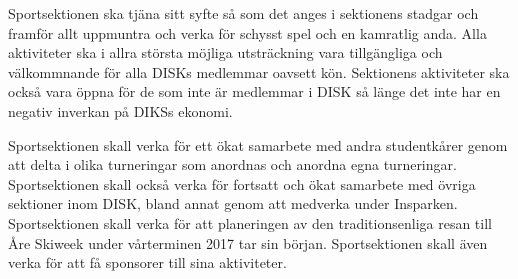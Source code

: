 \documentclass[12pt,a4paper]{article}
\begin{document}
	Sportsektionen ska tjäna sitt syfte så som det anges i sektionens stadgar och framför allt uppmuntra och verka för schysst spel och en kamratlig anda. Alla aktiviteter ska i allra största möjliga utsträckning vara tillgängliga och välkommnande för alla DISKs medlemmar oavsett kön. Sektionens aktiviteter ska också vara öppna för de som inte är medlemmar i DISK så länge det inte har en negativ inverkan på DIKSs ekonomi.

	Sportsektionen skall verka för ett ökat samarbete med andra studentkårer genom att delta i olika turneringar som anordnas och anordna egna turneringar. Sportsektionen skall också verka för fortsatt och ökat samarbete med övriga sektioner inom DISK, bland annat genom att medverka under Insparken. Sportsektionen skall verka för att planeringen av den traditionsenliga  resan till Åre Skiweek under vårterminen 2017 tar sin början. Sportsektionen skall även verka för att få sponsorer till sina aktiviteter.
\end{document}
